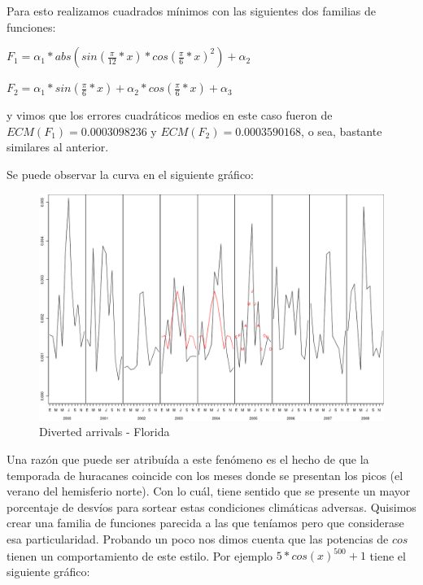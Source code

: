 Para esto realizamos cuadrados m\'inimos con las siguientes dos familias de funciones:

$F_1 = \alpha_1 * abs(sin(\frac{\pi}{12}*x) * cos(\frac{\pi}{6}*x)^2) + \alpha_2$

$F_2 = \alpha_1 * sin(\frac{\pi}{6}*x) + \alpha_2 * cos(\frac{\pi}{6}*x) + \alpha_3$

y vimos que los errores cuadr\'aticos medios en este caso fueron de $ECM(F_1) = 0.0003098236$ y $ECM(F_2) = 0.0003590168$, o sea, bastante similares al anterior.

Se puede observar la curva en el siguiente gr\'afico:

\begin{figure}[h!]
  \begin{center}
	\includegraphics[scale=0.4]{img/plot_FL_2003-2005.png}
	\caption{Diverted arrivals - Florida}
    \label{divertedArrivalsFlorida}
  \end{center}
\end{figure}

Una raz\'on que puede ser atribu\'ida a este fen\'omeno es el hecho de que la temporada de huracanes coincide con los meses donde se presentan los picos (el verano del hemisferio norte). Con lo cu\'al, tiene sentido que se presente un mayor porcentaje de desv\'ios para sortear estas condiciones clim\'aticas adversas. Quisimos crear una familia de funciones parecida a las que ten\'iamos pero que considerase esa particularidad.
Probando un poco nos dimos cuenta que las potencias de $cos$ tienen un comportamiento de este estilo. Por ejemplo $5*cos(x)^{500} + 1$ tiene el siguiente gr\'afico:

